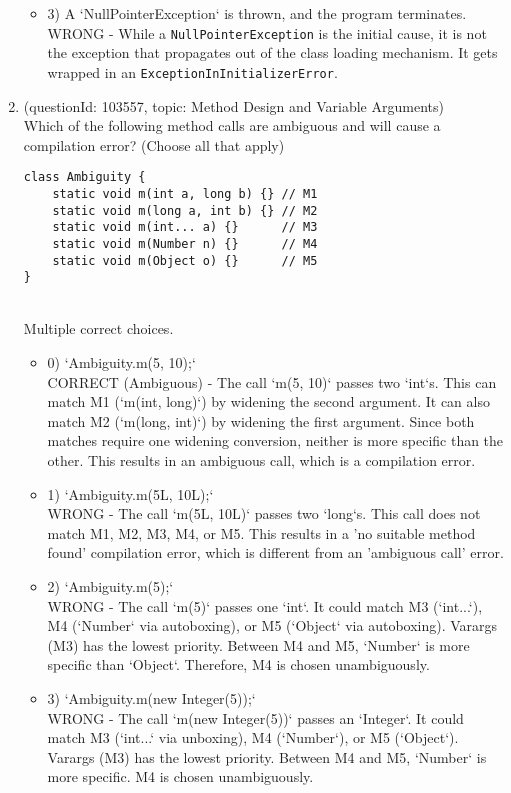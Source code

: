\documentclass[12pt]{article}
\begin{document}
\begin{enumerate}[label=(\arabic*)]
\begin{itemize}
\item 3) A `NullPointerException` is thrown, and the program terminates.
 \\ 
WRONG - While a \verb|NullPointerException| is the initial cause, it is not the exception that propagates out of the class loading mechanism. It gets wrapped in an \verb|ExceptionInInitializerError|.

\end{itemize}
\item (questionId: 103557, topic: Method Design and Variable Arguments) \\ 
Which of the following method calls are ambiguous and will cause a compilation error? (Choose all that apply)
\begin{verbatim}
class Ambiguity {
    static void m(int a, long b) {} // M1
    static void m(long a, int b) {} // M2
    static void m(int... a) {}      // M3
    static void m(Number n) {}      // M4
    static void m(Object o) {}      // M5
}
\end{verbatim}
\\ \noindent Multiple correct choices. 
\begin{itemize}
\item 0) `Ambiguity.m(5, 10);`
 \\ 
CORRECT (Ambiguous) - The call `m(5, 10)` passes two `int`s. This can match M1 (`m(int, long)`) by widening the second argument. It can also match M2 (`m(long, int)`) by widening the first argument. Since both matches require one widening conversion, neither is more specific than the other. This results in an ambiguous call, which is a compilation error.

\item 1) `Ambiguity.m(5L, 10L);`
 \\ 
WRONG - The call `m(5L, 10L)` passes two `long`s. This call does not match M1, M2, M3, M4, or M5. This results in a 'no suitable method found' compilation error, which is different from an 'ambiguous call' error.

\item 2) `Ambiguity.m(5);`
 \\ 
WRONG - The call `m(5)` passes one `int`. It could match M3 (`int...`), M4 (`Number` via autoboxing), or M5 (`Object` via autoboxing). Varargs (M3) has the lowest priority. Between M4 and M5, `Number` is more specific than `Object`. Therefore, M4 is chosen unambiguously.

\item 3) `Ambiguity.m(new Integer(5));`
 \\ 
WRONG - The call `m(new Integer(5))` passes an `Integer`. It could match M3 (`int...` via unboxing), M4 (`Number`), or M5 (`Object`). Varargs (M3) has the lowest priority. Between M4 and M5, `Number` is more specific. M4 is chosen unambiguously.


\end{itemize}
\end{enumerate}
\end{document}
